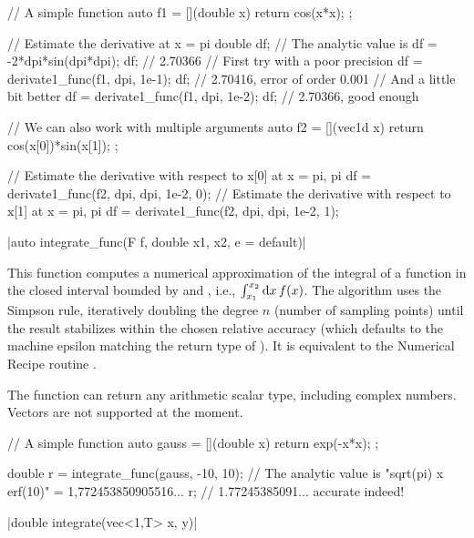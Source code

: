 \begin{example}
\begin{cppcode}
// A simple function
auto f1 = [](double x) {
    return cos(x*x);
};

// Estimate the derivative at x = pi
double df;
// The analytic value is
df = -2*dpi*sin(dpi*dpi);
df; // 2.70366
// First try with a poor precision
df = derivate1_func(f1, dpi, 1e-1);
df; // 2.70416, error of order 0.001
// And a little bit better
df = derivate1_func(f1, dpi, 1e-2);
df; // 2.70366, good enough

// We can also work with multiple arguments
auto f2 = [](vec1d x) {
    return cos(x[0])*sin(x[1]);
};

// Estimate the derivative with respect to x[0] at x = {pi, pi}
df = derivate1_func(f2, {dpi, dpi}, 1e-2, 0);
// Estimate the derivative with respect to x[1] at x = {pi, pi}
df = derivate1_func(f2, {dpi, dpi}, 1e-2, 1);
\end{cppcode}
\end{example}

\funcitem \cppinline|auto integrate_func(F f, double x1, x2, e = default)| 

This function computes a numerical approximation of the integral of a function  in the closed interval bounded by  and , i.e., $\int_{x_1}^{x_2} {\rm d}x\,f(x)$. The algorithm uses the Simpson rule, iteratively doubling the degree $n$ (number of sampling points) until the result stabilizes within the chosen relative accuracy  (which defaults to the machine epsilon matching the return type of ). It is equivalent to the Numerical Recipe routine .

The function  can return any arithmetic scalar type, including complex numbers. Vectors are not supported at the moment.

\begin{example}
\begin{cppcode}
// A simple function
auto gauss = [](double x) {
    return exp(-x*x);
};

double r = integrate_func(gauss, -10, 10);
// The analytic value is "sqrt(pi) x erf(10)" = 1,772453850905516...
r; // 1.77245385091... accurate indeed!
\end{cppcode}
\end{example}

\funcitem \cppinline|double integrate(vec<1,T> x, y)| 

